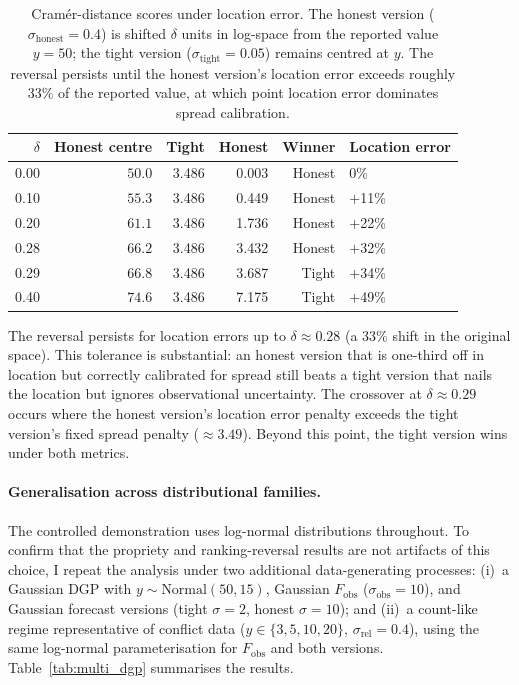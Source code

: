 \begin{table}[h]
    \centering
    \small
    \begin{tabular}{rrrrrl}
        \toprule
        $\delta$ & Honest centre & Tight & Honest & Winner & Location error \\
        \midrule
        0.00 & $50.0$ & 3.486 & 0.003 & Honest & 0\% \\
        0.10 & $55.3$ & 3.486 & 0.449 & Honest & $+$11\% \\
        0.20 & $61.1$ & 3.486 & 1.736 & Honest & $+$22\% \\
        0.28 & $66.2$ & 3.486 & 3.432 & Honest & $+$32\% \\
        0.29 & $66.8$ & 3.486 & 3.687 & Tight & $+$34\% \\
        0.40 & $74.6$ & 3.486 & 7.175 & Tight & $+$49\% \\
        \bottomrule
    \end{tabular}
    \caption{Cram\'er-distance scores under location error. The honest version ($\sigma_\text{honest} = 0.4$) is shifted $\delta$ units in log-space from the reported value $y = 50$; the tight version ($\sigma_\text{tight} = 0.05$) remains centred at $y$. The reversal persists until the honest version's location error exceeds roughly 33\% of the reported value, at which point location error dominates spread calibration.}
    \label{tab:loc_offset}
\end{table}

The reversal persists for location errors up to $\delta \approx 0.28$ (a 33\% shift in the original space). This tolerance is substantial: an honest version that is one-third off in location but correctly calibrated for spread still beats a tight version that nails the location but ignores observational uncertainty. The crossover at $\delta \approx 0.29$ occurs where the honest version's location error penalty exceeds the tight version's fixed spread penalty ($\approx 3.49$). Beyond this point, the tight version wins under both metrics.

\paragraph{Generalisation across distributional families.}
The controlled demonstration uses log-normal distributions throughout. To confirm that the propriety and ranking-reversal results are not artifacts of this choice, I repeat the analysis under two additional data-generating processes: (i)~a Gaussian DGP with $y \sim \text{Normal}(50, 15)$, Gaussian $F_\text{obs}$ ($\sigma_\text{obs} = 10$), and Gaussian forecast versions (tight $\sigma = 2$, honest $\sigma = 10$); and (ii)~a count-like regime representative of conflict data ($y \in \{3, 5, 10, 20\}$, $\sigma_\text{rel} = 0.4$), using the same log-normal parameterisation for $F_\text{obs}$ and both versions. Table~\ref{tab:multi_dgp} summarises the results.

